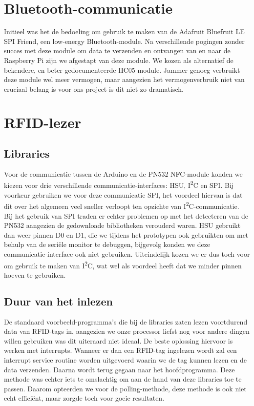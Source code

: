 \section{Bluetooth-communicatie}
Initieel was het de bedoeling om gebruik te maken van de Adafruit Bluefruit LE SPI Friend, een low-energy Bluetooth-module. Na verschillende pogingen zonder succes met deze module om data te verzenden en ontvangen van en naar de Raspberry Pi zijn we afgestapt van deze module. We kozen als alternatief de bekendere, en beter gedocumenteerde HC05-module. Jammer genoeg verbruikt deze module wel meer vermogen, maar aangezien het vermogenverbruik niet van cruciaal belang is voor ons project is dit niet zo dramatisch.

\section{RFID-lezer}
\subsection{Libraries}
Voor de communicatie tussen de Arduino en de PN532 NFC-module konden we kiezen voor drie verschillende communicatie-interfaces: HSU, I\textsuperscript{2}C en SPI.
Bij voorkeur gebruiken we voor deze communicatie SPI, het voordeel hiervan is dat dit over het algemeen veel sneller verloopt ten opzichte van I\textsuperscript{2}C-communicatie. Bij het gebruik van SPI traden er echter problemen op met het detecteren van de PN532 aangezien de gedownloade bibliotheken verouderd waren.
HSU gebruikt dan weer pinnen D0 en D1, die we tijdens het prototypen ook gebruikten om met behulp van de seri\"ele monitor te debuggen, bijgevolg konden we deze communicatie-interface ook niet gebruiken. Uiteindelijk kozen we er dus toch voor om gebruik te maken van I\textsuperscript{2}C, wat wel als voordeel heeft dat we minder pinnen hoeven te gebruiken.
\subsection{Duur van het inlezen}
De standaard voorbeeld-programma's die bij de libraries zaten lezen voortdurend data van RFID-tags in, aangezien we onze processor liefst nog voor andere dingen willen gebruiken was dit uiteraard niet ideaal. De beste oplossing hiervoor is werken met interrupts. Wanneer er dan een RFID-tag ingelezen wordt zal een interrupt service routine worden uitgevoerd waarin we de tag kunnen lezen en de data verzenden. Daarna wordt terug gegaan naar het hoofdprogramma. Deze methode was echter iets te omslachtig om aan de hand van deze libraries toe te passen. Daarom opteerden we voor de polling-methode, deze methode is ook niet echt effici\"ent, maar zorgde toch voor goeie resultaten. 

